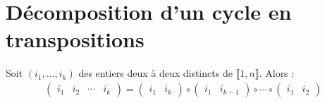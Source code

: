 \documentclass[../main.tex]{subfiles}
\begin{document}
\section{Décomposition d'un cycle en transpositions}
\begin{tcolorbox}[title=Lemme 29.62, title filled=false, colframe=orange, colback=orange!10!white]
    Soit $(i_1, \ldots, i_k)$ des entiers deux à deux distincts de $\llbracket 1, n \rrbracket$. Alors : 
    \begin{align*}
        \begin{pmatrix}
            i_1 & i_2 & \cdots & i_k
        \end{pmatrix} = \begin{pmatrix}
            i_1 & i_k
        \end{pmatrix} \circ \begin{pmatrix}
            i_1 & i_{k-1}
        \end{pmatrix} \circ \cdots \circ \begin{pmatrix}
            i_1 & i_2
        \end{pmatrix}
    \end{align*}
\end{tcolorbox}
\end{document}
